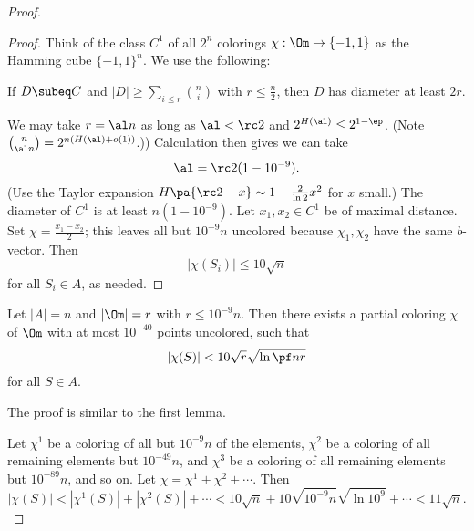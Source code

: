 \begin{proof}
\begin{proof}
Think of the class $C^1$ of all $2^n$ colorings $\chi:\Om\to \{-1,1\}$ as the Hamming cube $\{-1,1\}^n$. We use the following:
\begin{lem}[Kleitman]
If $D\subeq C$ and $|D|\ge \sum_{i\le r} \binom ni$ with $r\le \frac n2$, then $D$ has diameter at least $2r$.
\end{lem}
 We may take $r=\al n$ as long as $\al<\rc 2$ and $2^{H(\al)}\le 2^{1-\ep}$. (Note $\binom n{\al n}=2^{n(H(\al)+o(1))}$.)) Calculation then gives we can take
\[
\al=\rc 2(1-10^{-9}).
\]
(Use the Taylor expansion $H\pa{\rc 2-x}\sim 1-\frac{2}{\ln 2} x^2$ for $x$ small.)
The diameter of $C^1$ is at least $n(1-10^{-9})$. Let $x_1,x_2\in C^1$ be of maximal distance. Set $\chi=\frac{x_1-x_2}{2}$; this leaves all but $10^{-9}n$ uncolored because $\chi_1,\chi_2$ have the same $b$-vector. Then
\[
|\chi(S_i)|\le 10\sqrt n
\]
for all $S_i\in A$, as needed.
\end{proof}
\begin{lem}
Let $|A|=n$ and $|\Om|=r$ with $r\le 10^{-9}n$. Then there exists a partial coloring $\chi$ of $\Om$ with at most $10^{-40}$ points uncolored, such that 
\[
|\chi(S)|<10\sqrt r \sqrt{\ln \pf nr}
\]
for all $S\in A$.
\end{lem}
The proof is similar to the first lemma.

Let $\chi^1$ be a coloring of all but $10^{-9}n$ of the elements, $\chi^2$ be a coloring of all remaining elements but $10^{-49}n$, and $\chi^3$ be a coloring of all remaining elements but $10^{-89}n$, and so on. Let $\chi=\chi^1+\chi^2+\cdots$. Then
\[
|\chi(S)|<|\chi^1(S)|+|\chi^2(S)|+\cdots <10\sqrt n+10\sqrt{10^{-9}n}\sqrt{\ln 10^9}+\cdots <11\sqrt n.
\]
\end{proof}